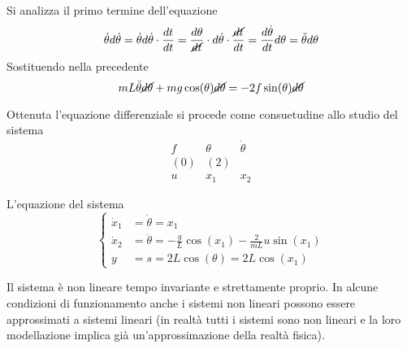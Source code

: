 Si analizza il primo termine dell'equazione
$$
\dot\theta d\dot\theta = \dot\theta d\dot\theta \cdot \frac{dt}{dt} =
\frac{d\theta}{\cancel{dt}}\cdot d\dot\theta\cdot \frac{\cancel{dt}}{dt} =
\frac{d\dot\theta}{dt}d\theta = \ddot\theta d\theta
$$
Sostituendo nella precedente
$$
mL\ddot\theta \cancel{d\theta} + mg\cos(\theta)\cancel{d\theta} = -2f
\sin(\theta) \cancel{d\theta}
$$

Ottenuta l'equazione differenziale si procede come consuetudine allo studio del
sistema
$$\begin{matrix}
f & \theta & \dot\theta \\
(0) & (2) \\
u & x_1 & x_2
\end{matrix}$$

L'equazione del sistema
$$\left\{\begin{aligned}
\dot x_1 &= \dot\theta = x_1 \\
\dot x_2 &= \ddot\theta = -\frac{g}{L}\cos(x_1) - \frac{2}{mL}u\sin(x_1)\\
y &= s = 2L\cos(\theta) = 2L\cos(x_1)
\end{aligned}\right.$$

Il sistema è non lineare tempo invariante e strettamente proprio.
In alcune condizioni di funzionamento anche i sistemi non lineari possono essere
approssimati a sistemi lineari (in realtà tutti i sistemi sono non lineari e la
loro modellazione implica già un'approssimazione della realtà fisica).

